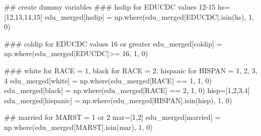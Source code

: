 \documentclass[
  letterpaper,
  DIV=11,
  numbers=noendperiod]{scrartcl}
\newenvironment{Shaded}{\begin{snugshade}}{\end{snugshade}}
\newcommand{\CommentTok}[1]{\textcolor[rgb]{0.37,0.37,0.37}{#1}}
\newcommand{\DecValTok}[1]{\textcolor[rgb]{0.68,0.00,0.00}{#1}}
\newcommand{\NormalTok}[1]{\textcolor[rgb]{0.00,0.23,0.31}{#1}}
\newcommand{\OperatorTok}[1]{\textcolor[rgb]{0.37,0.37,0.37}{#1}}
\newcommand{\StringTok}[1]{\textcolor[rgb]{0.13,0.47,0.30}{#1}}
\begin{document}
\begin{Shaded}
\begin{Highlighting}[]
\CommentTok{\#\# create dummy variables }
\CommentTok{\#\#\# hsdip for EDUCDC values 12{-}15}
\NormalTok{hs}\OperatorTok{=}\NormalTok{[}\DecValTok{12}\NormalTok{,}\DecValTok{13}\NormalTok{,}\DecValTok{14}\NormalTok{,}\DecValTok{15}\NormalTok{]}
\NormalTok{edu\_merged[}\StringTok{\textquotesingle{}hsdip\textquotesingle{}}\NormalTok{] }\OperatorTok{=}\NormalTok{ np.where(edu\_merged[}\StringTok{\textquotesingle{}EDUCDC\textquotesingle{}}\NormalTok{].isin(hs), }\DecValTok{1}\NormalTok{, }\DecValTok{0}\NormalTok{)}

\CommentTok{\#\#\# coldip for EDUCDC values 16 or greater}
\NormalTok{edu\_merged[}\StringTok{\textquotesingle{}coldip\textquotesingle{}}\NormalTok{] }\OperatorTok{=}\NormalTok{ np.where(edu\_merged[}\StringTok{\textquotesingle{}EDUCDC\textquotesingle{}}\NormalTok{]}\OperatorTok{\textgreater{}=} \DecValTok{16}\NormalTok{, }\DecValTok{1}\NormalTok{, }\DecValTok{0}\NormalTok{)}

\CommentTok{\#\#\# white for RACE = 1, black for RACE = 2, hispanic for HISPAN = 1, 2, 3, 4}
\NormalTok{edu\_merged[}\StringTok{\textquotesingle{}white\textquotesingle{}}\NormalTok{] }\OperatorTok{=}\NormalTok{ np.where(edu\_merged[}\StringTok{\textquotesingle{}RACE\textquotesingle{}}\NormalTok{] }\OperatorTok{==} \DecValTok{1}\NormalTok{, }\DecValTok{1}\NormalTok{, }\DecValTok{0}\NormalTok{)}
\NormalTok{edu\_merged[}\StringTok{\textquotesingle{}black\textquotesingle{}}\NormalTok{] }\OperatorTok{=}\NormalTok{ np.where(edu\_merged[}\StringTok{\textquotesingle{}RACE\textquotesingle{}}\NormalTok{] }\OperatorTok{==} \DecValTok{2}\NormalTok{, }\DecValTok{1}\NormalTok{, }\DecValTok{0}\NormalTok{)}
\NormalTok{hisp}\OperatorTok{=}\NormalTok{[}\DecValTok{1}\NormalTok{,}\DecValTok{2}\NormalTok{,}\DecValTok{3}\NormalTok{,}\DecValTok{4}\NormalTok{]}
\NormalTok{edu\_merged[}\StringTok{\textquotesingle{}hispanic\textquotesingle{}}\NormalTok{] }\OperatorTok{=}\NormalTok{ np.where(edu\_merged[}\StringTok{\textquotesingle{}HISPAN\textquotesingle{}}\NormalTok{].isin(hisp), }\DecValTok{1}\NormalTok{, }\DecValTok{0}\NormalTok{)}

\CommentTok{\#\# married for MARST = 1 or 2 }
\NormalTok{mar}\OperatorTok{=}\NormalTok{[}\DecValTok{1}\NormalTok{,}\DecValTok{2}\NormalTok{]}
\NormalTok{edu\_merged[}\StringTok{\textquotesingle{}married\textquotesingle{}}\NormalTok{] }\OperatorTok{=}\NormalTok{ np.where(edu\_merged[}\StringTok{\textquotesingle{}MARST\textquotesingle{}}\NormalTok{].isin(mar), }\DecValTok{1}\NormalTok{, }\DecValTok{0}\NormalTok{)}


\end{Highlighting}
\end{Shaded}
\end{document}
